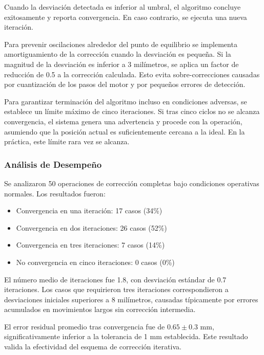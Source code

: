 Cuando la desviación detectada es inferior al umbral, el algoritmo concluye exitosamente y reporta convergencia. En caso contrario, se ejecuta una nueva iteración.

Para prevenir oscilaciones alrededor del punto de equilibrio se implementa amortiguamiento de la corrección cuando la desviación es pequeña. Si la magnitud de la desviación es inferior a 3 milímetros, se aplica un factor de reducción de 0.5 a la corrección calculada. Esto evita sobre-correcciones causadas por cuantización de los pasos del motor y por pequeños errores de detección.

Para garantizar terminación del algoritmo incluso en condiciones adversas, se establece un límite máximo de cinco iteraciones. Si tras cinco ciclos no se alcanza convergencia, el sistema genera una advertencia y procede con la operación, asumiendo que la posición actual es suficientemente cercana a la ideal. En la práctica, este límite rara vez se alcanza.

\subsubsection{Análisis de Desempeño}

Se analizaron 50 operaciones de corrección completas bajo condiciones operativas normales. Los resultados fueron:

\begin{itemize}
\item Convergencia en una iteración: 17 casos (34\%)
\item Convergencia en dos iteraciones: 26 casos (52\%)
\item Convergencia en tres iteraciones: 7 casos (14\%)
\item No convergencia en cinco iteraciones: 0 casos (0\%)
\end{itemize}

El número medio de iteraciones fue 1.8, con desviación estándar de 0.7 iteraciones. Los casos que requirieron tres iteraciones correspondieron a desviaciones iniciales superiores a 8 milímetros, causadas típicamente por errores acumulados en movimientos largos sin corrección intermedia.

El error residual promedio tras convergencia fue de $0.65 \pm 0.3$ mm, significativamente inferior a la tolerancia de 1 mm establecida. Este resultado valida la efectividad del esquema de corrección iterativa.

